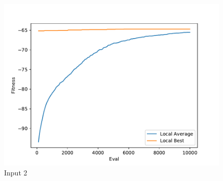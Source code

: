 \documentclass{standalone}
\begin{document}
\begin{figure}[!htb]
	\caption{Input 2}
	\label{fig:graph_2029}
	\includegraphics[width=\textwidth]{../graphs/graphs/2029.pdf}
\end{figure}
\end{document}
